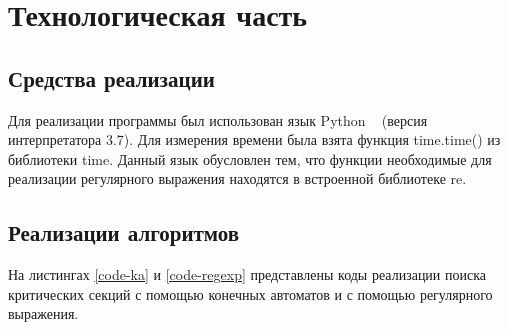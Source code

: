 \documentclass[12pt, a4paper]{report}
\begin{document}
	\chapter{Технологическая часть}
	\section{Средства реализации}
	\hspace{0.5cm}Для реализации программы был использован язык Python ~\cite{py} (версия интерпретатора 3.7). Для измерения времени была взята функция time.time() из
	библиотеки time. Данный язык обусловлен тем, что функции необходимые для реализации регулярного
	выражения находятся в встроенной библиотеке re.
	
	\section{Реализации алгоритмов}
	На листингах \ref{code-ka} и \ref{code-regexp} представлены коды реализации поиска критических секций с помощью конечных автоматов и с помощью регулярного выражения.
	
	
\end{document}
